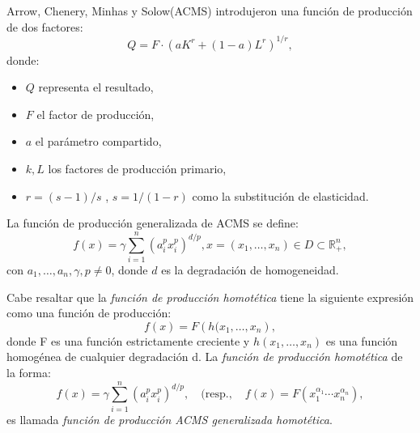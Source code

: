 \documentclass[
    a4paper,%
    11pt, %
    fleqn %
]{article}
\begin{document}
Arrow, Chenery, Minhas y Solow(ACMS) introdujeron una función de producción de dos factores:
\begin{equation}%
Q = F\cdot(aK^r + (1-a)L^r)^{1/r},
\end{equation}
donde:
\begin{itemize}
	\item $Q$ representa el resultado,
	\item $F$ el factor de producción,
	\item $a$ el parámetro compartido,
	\item $k,L$ los factores de producción primario,
	\item $r=(s- 1)/s$ , $s=1/(1-r)$ como la substitución de elasticidad.
\end{itemize}

La función de producción generalizada de ACMS se define:
\begin{equation}\label{eq:5}
f\left(x\right) = \gamma\sum_{i=1}^{n} ({{a}_{i}^{p}x_{i}^{p}})^{d/p},x=\left(x_{1},\ldots,x_{n}\right)\in D\subset\mathbb{R}_{+}^{n},
\end{equation}
con $a_{1},\ldots,a_{n},\gamma,p\neq0$, donde $d$ es la degradación de homogeneidad.

Cabe resaltar que la \emph{función de producción homotética} tiene la siguiente expresión como una función de producción:
\begin{equation}\label{eq:6}
f(x) = F\left(h(x_1,\ldots,x_n\right),
\end{equation}
donde F es una función estrictamente creciente y $h\left(x_1,\ldots,x_n\right)$ es una función homogénea de cualquier degradación d. La \emph{función de producción homotética} de la forma:
\begin{equation}\label{eq:7}
f\left(x\right) = \gamma\sum_{i=1}^{n} ({{a}_{i}^{p}x_{i}^{p}})^{d/p},\quad(\text{resp.},\quad f(x)=F(x_{1}^{\alpha_1}\cdots x_{n}^{\alpha_n}),
\end{equation}
es llamada \emph{función de producción ACMS generalizada homotética}.
\end{document}
